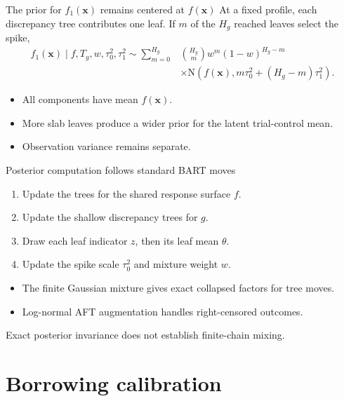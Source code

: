 \documentclass[11pt,aspectratio=169]{beamer}
\newcommand{\Normal}{\mathrm{N}}
\newcommand{\bx}{\bm{x}}
\newcommand{\sectionframe}[1]{%
  \begin{frame}[plain]
    \vspace*{0.46\paperheight}
    \hspace*{0.65cm}{\LARGE\bfseries #1}
  \end{frame}}
\begin{document}
\begin{frame}{The prior for \(f_1(\bx)\) remains centered at \(f(\bx)\)}
  \normalsize
  At a fixed profile, each discrepancy tree contributes one leaf. If $m$ of the $H_g$ reached leaves select the spike,
  \[
  \begin{split}
  f_1(\bx)\mid f,T_g,w,\tau_0^2,\tau_1^2
  \sim \sum_{m=0}^{H_g}
  &\binom{H_g}{m}w^m(1-w)^{H_g-m}\\[-0.2em]
  &\times\Normal\!\left(f(\bx),
      m\tau_0^2+(H_g-m)\tau_1^2\right).
  \end{split}
  \]

  \vspace{0.4em}
  \begin{itemize}\setlength\itemsep{0.45em}
    \item All components have mean $f(\bx)$.
    \item More slab leaves produce a wider prior for the latent trial-control mean.
    \item Observation variance remains separate.
  \end{itemize}
\end{frame}

\begin{frame}{Posterior computation follows standard BART moves}
  \large
  \begin{enumerate}\setlength\itemsep{0.75em}
    \item Update the trees for the shared response surface $f$.
    \item Update the shallow discrepancy trees for $g$.
    \item Draw each leaf indicator $z$, then its leaf mean $\theta$.
    \item Update the spike scale $\tau_0^2$ and mixture weight $w$.
  \end{enumerate}

  \vspace{0.6em}
  \begin{itemize}\setlength\itemsep{0.45em}
    \item The finite Gaussian mixture gives exact collapsed factors for tree moves.
    \item Log-normal AFT augmentation handles right-censored outcomes.
  \end{itemize}

  \vfill
  {\small Exact posterior invariance does not establish finite-chain mixing.}
\end{frame}

\section{Borrowing calibration}
\sectionframe{Calibrating the amount of borrowing}
\end{document}

